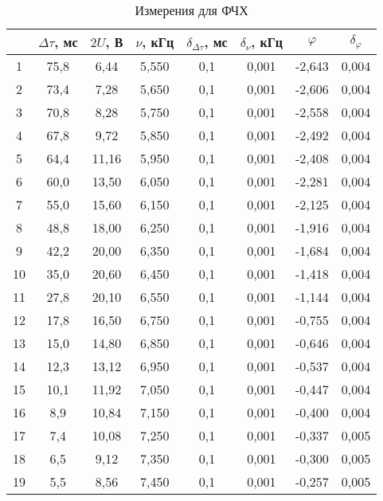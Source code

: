 \begin{table}
\centering
\caption{Измерения для ФЧХ}
\begin{tabular}{|c|c|c|c|c|c|c|c|}
\hline
 & $\Delta\tau$, мс & $2U$, В & $\nu$, кГц & $\delta_{\Delta\tau}$, мс & $\delta_{\nu}$, кГц & $\varphi$ & $\delta_{\varphi}$ \\
\hline
1 & 75,8 & 6,44 & 5,550 & 0,1 & 0,001 & -2,643 & 0,004 \\
\cline{1-8}
2 & 73,4 & 7,28 & 5,650 & 0,1 & 0,001 & -2,606 & 0,004 \\
\cline{1-8}
3 & 70,8 & 8,28 & 5,750 & 0,1 & 0,001 & -2,558 & 0,004 \\
\cline{1-8}
4 & 67,8 & 9,72 & 5,850 & 0,1 & 0,001 & -2,492 & 0,004 \\
\cline{1-8}
5 & 64,4 & 11,16 & 5,950 & 0,1 & 0,001 & -2,408 & 0,004 \\
\cline{1-8}
6 & 60,0 & 13,50 & 6,050 & 0,1 & 0,001 & -2,281 & 0,004 \\
\cline{1-8}
7 & 55,0 & 15,60 & 6,150 & 0,1 & 0,001 & -2,125 & 0,004 \\
\cline{1-8}
8 & 48,8 & 18,00 & 6,250 & 0,1 & 0,001 & -1,916 & 0,004 \\
\cline{1-8}
9 & 42,2 & 20,00 & 6,350 & 0,1 & 0,001 & -1,684 & 0,004 \\
\cline{1-8}
10 & 35,0 & 20,60 & 6,450 & 0,1 & 0,001 & -1,418 & 0,004 \\
\cline{1-8}
11 & 27,8 & 20,10 & 6,550 & 0,1 & 0,001 & -1,144 & 0,004 \\
\cline{1-8}
12 & 17,8 & 16,50 & 6,750 & 0,1 & 0,001 & -0,755 & 0,004 \\
\cline{1-8}
13 & 15,0 & 14,80 & 6,850 & 0,1 & 0,001 & -0,646 & 0,004 \\
\cline{1-8}
14 & 12,3 & 13,12 & 6,950 & 0,1 & 0,001 & -0,537 & 0,004 \\
\cline{1-8}
15 & 10,1 & 11,92 & 7,050 & 0,1 & 0,001 & -0,447 & 0,004 \\
\cline{1-8}
16 & 8,9 & 10,84 & 7,150 & 0,1 & 0,001 & -0,400 & 0,004 \\
\cline{1-8}
17 & 7,4 & 10,08 & 7,250 & 0,1 & 0,001 & -0,337 & 0,005 \\
\cline{1-8}
18 & 6,5 & 9,12 & 7,350 & 0,1 & 0,001 & -0,300 & 0,005 \\
\cline{1-8}
19 & 5,5 & 8,56 & 7,450 & 0,1 & 0,001 & -0,257 & 0,005 \\
\cline{1-8}
\hline
\end{tabular}
\end{table}

